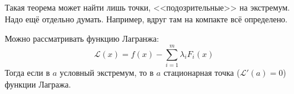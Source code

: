 \documentclass[12pt,timbord]{../../../notes}
\begin{document}
\begin{rem}
  Такая теорема может найти лишь точки, <<подозрительные>> на экстремум. Надо ещё отдельно
  думать. Например, вдруг там на компакте всё определено.
\end{rem}
\begin{rem}
  Можно рассматривать функцию Лагранжа:
  \[
    \mathcal L (x) = f(x) - \sum_{i=1}^m \lambda_i F_i(x)
  \]
  Тогда если в $a$ условный экстремум, то в $a$ стационарная точка ($\mathcal L'(a) = 0$) функции
  Лагража.
\end{rem}
\end{document}
